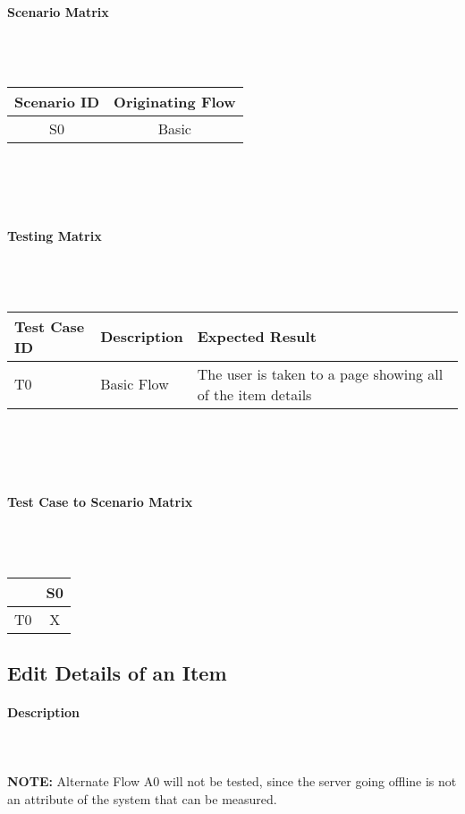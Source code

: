 \documentclass{article}
\begin{document}
\paragraph{Scenario Matrix}~\\ \\
\begin{tabular}{ c  c }
\hline
Scenario ID & Originating Flow\\
\hline
\hline
S0 & Basic\\
\hline
\end{tabular}\\
~\\
~\\
\paragraph{Testing Matrix}~\\ \\
\begin{tabular}{ p{0.6in}  p{2.3in}  p{2.6in} }
\hline
Test Case ID & Description & Expected Result\\
\hline
\hline
T0 & Basic Flow & The user is taken to a page showing all of the item details\\
\hline
\end{tabular}\\
~\\
~\\
\paragraph{Test Case to Scenario Matrix}~\\ \\
\begin{tabular}{ | c || c | }
\hline
    & S0\\
\hline
\hline
T0 & X  \\
\hline
\end{tabular}

\subsection{Edit Details of an Item}
\paragraph{Description}
~\\ \\
\textbf{NOTE:} Alternate Flow A0 will not be tested, since the server going offline is not an attribute of the system that can be measured.
\end{document}
